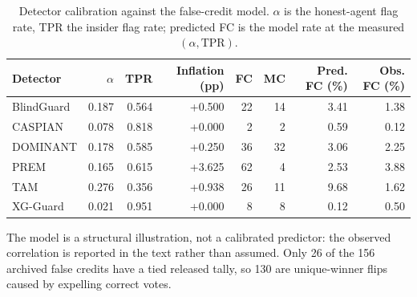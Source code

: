 \begin{table}[htbp]
\centering
\small
\caption{Detector calibration against the false-credit model. $\alpha$ is the honest-agent flag rate, TPR the insider flag rate; predicted FC is the model rate at the measured $(\alpha,\mathrm{TPR})$.}
\label{tab:false-credit}
\begin{tabular}{lrrrrrrr}
\toprule
Detector & $\alpha$ & TPR & Inflation (pp) & FC & MC & Pred. FC (\%) & Obs. FC (\%) \\
\midrule
BlindGuard & 0.187 & 0.564 & +0.500 & 22 & 14 & 3.41 & 1.38 \\
CASPIAN & 0.078 & 0.818 & +0.000 & 2 & 2 & 0.59 & 0.12 \\
DOMINANT & 0.178 & 0.585 & +0.250 & 36 & 32 & 3.06 & 2.25 \\
PREM & 0.165 & 0.615 & +3.625 & 62 & 4 & 2.53 & 3.88 \\
TAM & 0.276 & 0.356 & +0.938 & 26 & 11 & 9.68 & 1.62 \\
XG-Guard & 0.021 & 0.951 & +0.000 & 8 & 8 & 0.12 & 0.50 \\
\bottomrule
\end{tabular}
\par\smallskip\footnotesize The model is a structural illustration, not a calibrated predictor: the observed correlation is reported in the text rather than assumed. Only 26 of the 156 archived false credits have a tied released tally, so 130 are unique-winner flips caused by expelling correct votes.
\end{table}
